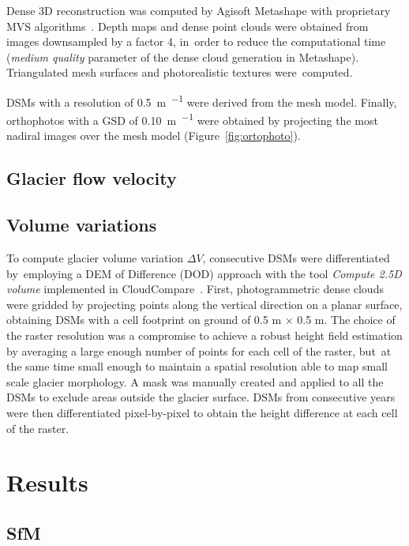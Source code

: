 Dense 3D reconstruction was computed by Agisoft Metashape with proprietary MVS algorithms~\citep{Dallasta}.
Depth maps and dense point clouds were obtained from images downsampled by a factor 4, in~order to reduce the computational time (\textit{medium quality} parameter of the dense cloud generation in Metashape).
Triangulated mesh surfaces and photorealistic textures were~computed. 

DSMs with a resolution of \SI{0.5}{\meter\per\pixel} were derived from the mesh model.
Finally, orthophotos with a GSD of \SI{0.10}{\meter\per\pixel} were obtained by projecting the most nadiral images over the mesh model (Figure~\ref{fig:ortophoto}).


\subsection{Glacier flow velocity}

\subsection{Volume variations}

To compute glacier volume variation $ \Delta V $, consecutive DSMs were differentiated by~employing a DEM of Difference (DOD) approach with the tool \textit{Compute 2.5D volume} implemented in CloudCompare~\cite{cloudcompare}.
First, photogrammetric dense clouds were gridded by projecting points along the vertical direction on a planar surface, obtaining DSMs with a cell footprint on ground of 0.5 m $\times$ 0.5 m. 
The choice of the raster resolution was a compromise to achieve a robust height field estimation by averaging a large enough number of points for each cell of the raster, but~at the same time small enough to maintain a spatial resolution able to map small scale glacier morphology.
A mask was manually created and applied to all the DSMs to exclude areas outside the glacier surface.
DSMs from consecutive years were then differentiated pixel-by-pixel to obtain the height difference at each cell of the raster.

\section{Results}

\subsection{SfM}

